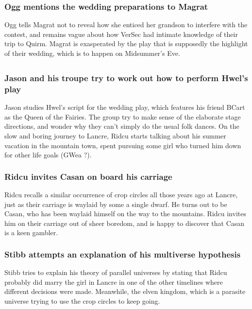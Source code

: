 \subsubsection{\Gls{Ogg} mentions the wedding preparations to \Gls{Magrat}}
\Gls{Ogg} tells \Gls{Magrat} not to reveal how she enticed her grandson to interfere with the
contest, and remains vague about how \Gls{VerSec} had intimate knowledge of their trip to Quirm.
\Gls{Magrat} is exasperated by the play that is supposedly the highlight of their wedding, which is
to happen on Midsummer's Eve.

\subsection{}
\subsubsection{\Gls{Jason} and his troupe try to work out how to perform \Gls{Hwel}'s play}
\Gls{Jason} studies \Gls{Hwel}'s script for the wedding play, which features his friend \Gls{BCart}
as the Queen of the Fairies. The group try to make sense of the elaborate stage directions, and
wonder why they can't simply do the usual folk dances. On the slow and boring journey to Lancre,
\Gls{Ridcu} starts talking about his summer vacation in the mountain town, spent pursuing some girl
who turned him down for other life goals (\Gls{GWea} ?).

\subsubsection{\Gls{Ridcu} invites \Gls{Casan} on board his carriage}
\Gls{Ridcu} recalls a similar occurrence of crop circles all those years ago at Lancre, just as
their carriage is waylaid by some a single dwarf. He turns out to be \Gls{Casan}, who has been
waylaid himself on the way to the mountains. \Gls{Ridcu} invites him on their carriage out of sheer
boredom, and is happy to discover that \Gls{Casan} is a keen gambler.

\subsubsection{\Gls{Stibb} attempts an explanation of his multiverse hypothesis}
\Gls{Stibb} tries to explain his theory of parallel universes by stating that \Gls{Ridcu} probably
did marry the girl in Lancre in one of the other timelines where different decisions were made.
Meanwhile, the elven kingdom, which is a parasite universe trying to use the crop circles to keep
going.


